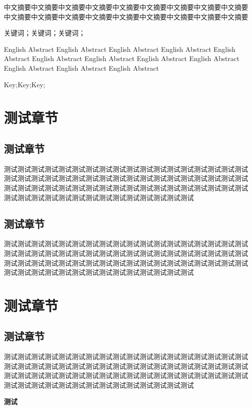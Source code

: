 \documentclass[a4paper,10.5pt]{article}
\begin{document}
\pagecover{}

\begin{cnabstract}
中文摘要中文摘要中文摘要中文摘要中文摘要中文摘要中文摘要中文摘要中文摘要中文摘要中文摘要中文摘要中文摘要中文摘要中文摘要中文摘要中文摘要中文摘要

\begin{cnkeywords}
关键词；关键词；关键词；
\end{cnkeywords}
\end{cnabstract}
\vspace{0.5cm}
\begin{enabstract}
English Abstract English Abstract English Abstract English Abstract English Abstract English Abstract English Abstract English Abstract English Abstract English Abstract English Abstract English Abstract 

\begin{enkeywords}
Key;Key;Key;
\end{enkeywords}
\end{enabstract}

\newpage

\section{测试章节}

\subsection{测试章节}

测试测试测试测试测试测试测试测试测试测试测试测试测试测试测试测试测试测试测试测试测试测试测试测试测试测试测试测试测试测试测试测试测试测试测试测试测试测试测试测试测试测试测试测试测试测试测试测试测试测试测试测试测试测试测试测试测试测试测试测试测试测试测试测试测试测试测试测试

\subsection{测试章节}

测试测试测试测试测试测试测试测试测试测试测试测试测试测试测试测试测试测试测试测试测试测试测试测试测试测试测试测试测试测试测试测试测试测试测试测试测试测试测试测试测试测试测试测试测试测试测试测试测试测试测试测试测试测试测试测试测试测试测试测试测试测试测试测试测试测试测试测试

\section{测试章节}

\subsection{测试章节}

测试测试测试测试测试测试测试测试测试测试测试测试测试测试测试测试测试测试测试测试测试测试测试测试测试测试测试测试测试测试测试测试测试测试测试测试测试测试测试测试测试测试测试测试测试测试测试测试测试测试测试测试测试测试测试测试测试测试测试测试测试测试测试测试测试测试测试测试\cite{Pregel10}

\textbf{测试}



\end{document}

